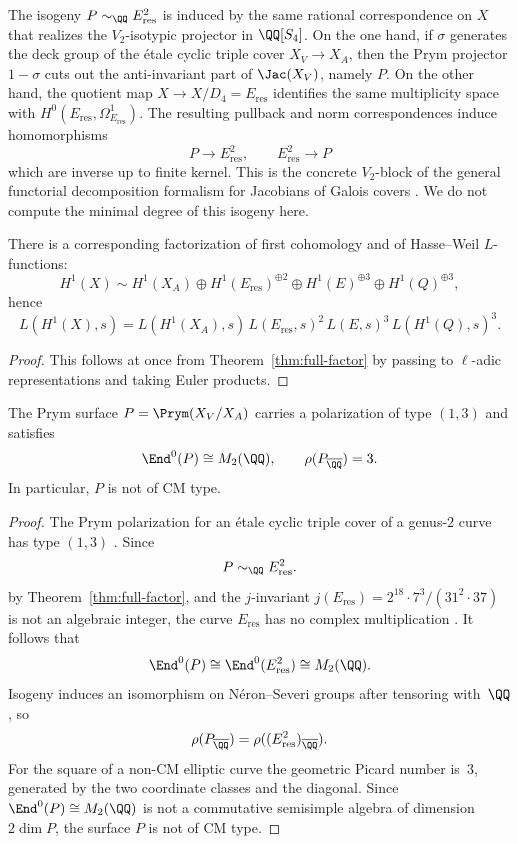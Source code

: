 \begin{remark}\label{rem:prym-correspondence}
The isogeny \(P\sim_{\QQ}E_{\mathrm{res}}^2\) is induced by the same rational correspondence on \(X\) that realizes the \(V_2\)-isotypic projector in \(\QQ[S_4]\). On the one hand, if \(\sigma\) generates the deck group of the \'etale cyclic triple cover \(X_V\to X_A\), then the Prym projector \(1-\sigma\) cuts out the anti-invariant part of \(\Jac(X_V)\), namely \(P\). On the other hand, the quotient map \(X\to X/D_4=E_{\mathrm{res}}\) identifies the same multiplicity space with \(H^0(E_{\mathrm{res}},\Omega_{E_{\mathrm{res}}}^1)\). The resulting pullback and norm correspondences induce homomorphisms
\[
P\longrightarrow E_{\mathrm{res}}^2,
\qquad
E_{\mathrm{res}}^2\longrightarrow P
\]
which are inverse up to finite kernel. This is the concrete \(V_2\)-block of the general functorial decomposition formalism for Jacobians of Galois covers \cite{LombardoEtAl2023}. We do not compute the minimal degree of this isogeny here.
\end{remark}

\begin{corollary}\label{cor:l-factor}
There is a corresponding factorization of first cohomology and of Hasse--Weil \(L\)-functions:
\[
H^1(X)\sim H^1(X_A)\oplus H^1(E_{\mathrm{res}})^{\oplus 2}\oplus H^1(E)^{\oplus 3}\oplus H^1(Q)^{\oplus 3},
\]
hence
\[
L(H^1(X),s)=L(H^1(X_A),s)\,L(E_{\mathrm{res}},s)^2\,L(E,s)^3\,L(H^1(Q),s)^3.
\]
\end{corollary}

\begin{proof}
This follows at once from Theorem~\ref{thm:full-factor} by passing to \(\ell\)-adic representations and taking Euler products.
\end{proof}

\begin{proposition}\label{prop:prym-end}
The Prym surface \(P=\Prym(X_V/X_A)\) carries a polarization of type \((1,3)\) and satisfies
\[
\End^0(P)\cong M_2(\QQ),
\qquad
\rho(P_{\overline{\QQ}})=3.
\]
In particular, \(P\) is not of CM type.
\end{proposition}

\begin{proof}
The Prym polarization for an \'etale cyclic triple cover of a genus-\(2\) curve has type \((1,3)\) \cite[Section~12.9]{BirkenhakeLange2004}. Since
\[
P\sim_{\QQ}E_{\mathrm{res}}^2.
\]
by Theorem~\ref{thm:full-factor}, and the \(j\)-invariant \(j(E_{\mathrm{res}})=2^{18}\cdot 7^3/(31^2\cdot 37)\) is not an algebraic integer, the curve \(E_{\mathrm{res}}\) has no complex multiplication \cite[Ch.~II]{Silverman2009}. It follows that
\[
\End^0(P)\cong \End^0(E_{\mathrm{res}}^2)\cong M_2(\QQ).
\]
Isogeny induces an isomorphism on N\'eron--Severi groups after tensoring with~\(\QQ\), so
\[
\rho(P_{\overline{\QQ}})=\rho((E_{\mathrm{res}}^2)_{\overline{\QQ}}).
\]
For the square of a non-CM elliptic curve the geometric Picard number is~\(3\), generated by the two coordinate classes and the diagonal. Since \(\End^0(P)\cong M_2(\QQ)\) is not a commutative semisimple algebra of dimension \(2\dim P\), the surface \(P\) is not of CM type.
\end{proof}

